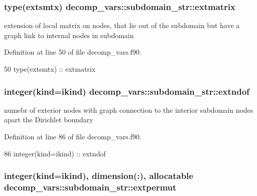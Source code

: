 \subsubsection[{extmatrix}]{\setlength{\rightskip}{0pt plus 5cm}type({\bf extsmtx}) decomp\+\_\+vars\+::subdomain\+\_\+str\+::extmatrix}\label{structdecomp__vars_1_1subdomain__str_a885292a0fd61df48a0df5c371f0f7cc3}


extension of local matrix on nodes, that lie out of the subdomain but have a graph link to internal nodes in subdomain 



Definition at line 50 of file decomp\+\_\+vars.\+f90.


\begin{DoxyCode}
50     \textcolor{keywordtype}{type}(extsmtx) :: extmatrix    
\end{DoxyCode}
\subsubsection[{extndof}]{\setlength{\rightskip}{0pt plus 5cm}integer(kind=ikind) decomp\+\_\+vars\+::subdomain\+\_\+str\+::extndof}\label{structdecomp__vars_1_1subdomain__str_a6cd79748b559b50588c997c7753ee3f7}


numebr of exterior nodes with graph connection to the interior subdomain nodes apart the Dirichlet boundary 



Definition at line 86 of file decomp\+\_\+vars.\+f90.


\begin{DoxyCode}
86     \textcolor{keywordtype}{integer(kind=ikind)} :: extndof
\end{DoxyCode}
\subsubsection[{extpermut}]{\setlength{\rightskip}{0pt plus 5cm}integer(kind=ikind), dimension(\+:), allocatable decomp\+\_\+vars\+::subdomain\+\_\+str\+::extpermut}\label{structdecomp__vars_1_1subdomain__str_a50a96f05530ddcc3652c93ed5885b40d}


